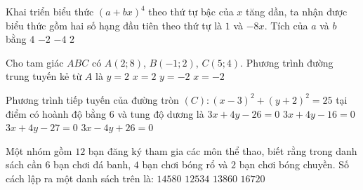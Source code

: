 \begin{ex}%
	Khai triển biểu thức $(a+b x)^4$ theo thứ tự bậc của $x$ tăng dần, ta nhận được biểu thức gồm hai số hạng đầu tiên theo thứ tự là $ 1 $ và $-8 x$. Tích của $a$ và $b$ bằng 
	\choice
	{$4$}
	{\True $-2$}
	{$-4$}
	{$2$}
\end{ex}

\begin{ex}%
	Cho tam giác $ABC$ có $A(2 ; 8)$, $B(-1 ; 2)$, $C(5 ; 4)$. Phương trình đường trung tuyến kẻ từ $A$ là
	\choice
	{$y=2$}
	{\True $x=2$}
	{$y=-2$}
	{$x=-2$}
\end{ex}

\begin{ex}%
	Phương trình tiếp tuyến của đường tròn $(C)\colon (x-3)^2+(y+2)^2=25$ tại điểm có hoành độ bằng $ 6 $ và tung độ dương là
	\choice
	{\True $3 x+4 y-26=0$}
	{$3 x+4 y-16=0$}
	{$3 x+4 y-27=0$}
	{$3 x-4 y+26=0$}
\end{ex}

\begin{ex}%
	Một nhóm gồm $ 12 $ bạn đăng ký tham gia các môn thể thao, biết rằng trong danh sách cần $ 6 $ bạn chơi đá banh, $ 4 $ bạn chơi bóng rổ và $ 2 $ bạn chơi bóng chuyền. Số cách lập ra một danh sách trên là:
	\choice
	{$14580$}
	{$12534$}
	{\True $13860$}
	{$16720$}
\end{ex}

